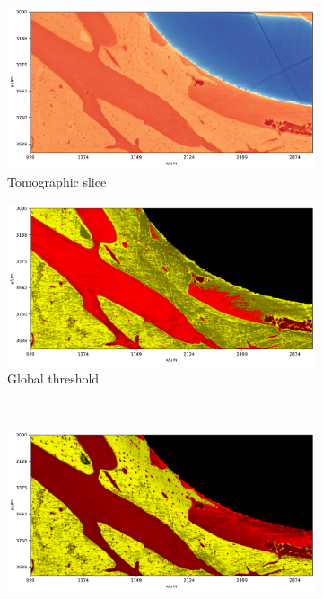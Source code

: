 \begin{figure}
  \centering
    \begin{subfigure}{0.5\textwidth}
      \centering
      \includegraphics[width=\linewidth]{generated/770c_pag_segmented_yx_raw.pdf}
      \caption{Tomographic slice}
    \end{subfigure}%
    \begin{subfigure}{0.5\textwidth}
      \centering
      \includegraphics[width=\linewidth]{generated/770c_pag_global_yx.pdf}
      \caption{Global threshold}
    \end{subfigure}
    \\
    \begin{subfigure}{0.5\textwidth}
      \centering
      \includegraphics[width=\linewidth]{generated/770c_pag_segmented_yx_colored.pdf}

\end{subfigure}
\end{figure}
